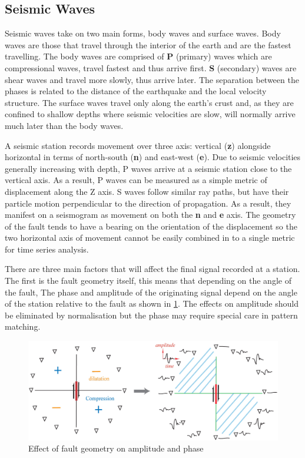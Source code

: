 \documentclass[../report.tex]{subfiles}
\begin{document}
	
\subsection{Seismic Waves} \label{sec:seismicwaves}
	Seismic waves take on two main forms, body waves and surface waves.  Body waves are those that travel through the interior of the earth and are the fastest travelling.  The body waves are comprised of \textbf{P} (primary) waves which are compressional waves, travel fastest and thus arrive first.  \textbf{S} (secondary) waves are shear waves and travel more slowly, thus arrive later.  The separation between the phases is related to the distance of the earthquake and the local velocity structure. The surface waves travel only along the earth's crust and, as they are confined to shallow depths where seismic velocities are slow, will normally arrive much later than the body waves.
	
	A seismic station records movement over three axis: vertical (\textbf{z}) alongside horizontal in terms of north-south (\textbf{n}) and east-west (\textbf{e}).  Due to seismic velocities generally increasing with depth, P waves arrive at a seismic station close to the vertical axis.  As a result, P waves can be measured as a simple metric of displacement along the Z axis.  S waves follow similar ray paths, but have their particle motion perpendicular to the direction of propagation.  As a result, they manifest on a seismogram as movement on both the \textbf{n} and \textbf{e} axis. The geometry of the fault tends to have a bearing on the orientation of the displacement so the two horizontal axis of movement cannot be easily combined in to a single metric for time series analysis.
	
	There are three main factors that will affect the final signal recorded at a station.  The first is the fault geometry itself, this means that depending on the angle of the fault, The phase and amplitude of the originating signal depend on the angle of the station relative to the fault as shown in \cref{fig:faultangle}.  The effects on amplitude should be eliminated by normalisation but the phase may require special care in pattern matching.
	
\begin{figure}[H]
	\centering
	\includegraphics[width=1\linewidth]{img/fault_angle}
	\caption{Effect of fault geometry on amplitude and phase \citep{faultangle}}
	\label{fig:faultangle}
\end{figure}
\end{document}

